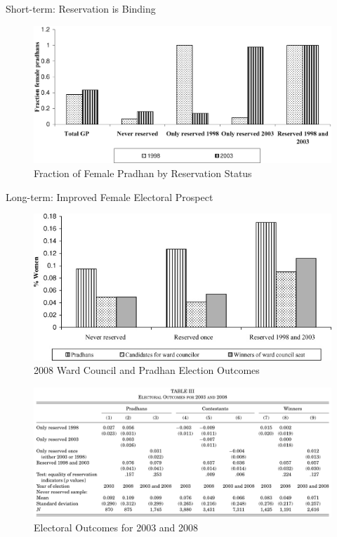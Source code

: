 \documentclass[
  10pt,
  ignorenonframetext,
  aspectratio=43,
]{beamer}
\begin{document}
\begin{frame}{Short-term: Reservation is Binding}
\protect\hypertarget{short-term-reservation-is-binding}{}
\begin{figure}
\centering
\includegraphics{20220523-qje-beaman-duflo-powerful-women.assets/figure1-binding policy effect.png}
\caption{Fraction of Female Pradhan by Reservation Status}
\end{figure}
\end{frame}

\begin{frame}{Long-term: Improved Female Electoral Prospect}
\protect\hypertarget{long-term-improved-female-electoral-prospect}{}
\begin{figure}
\centering
\includegraphics{20220523-qje-beaman-duflo-powerful-women.assets/figure2-electoral prospect.png}
\caption{2008 Ward Council and Pradhan Election Outcomes}
\end{figure}
\end{frame}

\begin{frame}
\begin{figure}
\centering
\includegraphics{20220523-qje-beaman-duflo-powerful-women.assets/table3-electoral outcomes.png}
\caption{Electoral Outcomes for 2003 and 2008}
\end{figure}
\end{frame}
\end{document}
